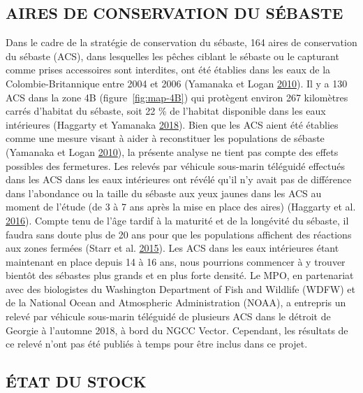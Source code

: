 \documentclass[french,11pt]{book}
\begin{document}
\hypertarget{sec:discussion-rca}{%
\subsection{AIRES DE CONSERVATION DU SÉBASTE}\label{sec:discussion-rca}}

Dans le cadre de la stratégie de conservation du sébaste, 164 aires de conservation du sébaste (ACS), dans lesquelles les pêches ciblant le sébaste ou le capturant comme prises accessoires sont interdites, ont été établies dans les eaux de la Colombie-Britannique entre 2004 et 2006 (Yamanaka et Logan \protect\hyperlink{ref-yamanaka2010}{2010}). Il y a 130 ACS dans la zone 4B (figure~\ref{fig:map-4B}) qui protègent environ 267 kilomètres carrés d'habitat du sébaste, soit 22 \% de l'habitat disponible dans les eaux intérieures (Haggarty et Yamanaka \protect\hyperlink{ref-haggarty2018}{2018}). Bien que les ACS aient été établies comme une mesure visant à aider à reconstituer les populations de sébaste (Yamanaka et Logan \protect\hyperlink{ref-yamanaka2010}{2010}), la présente analyse ne tient pas compte des effets possibles des fermetures. Les relevés par véhicule sous-marin téléguidé effectués dans les ACS dans les eaux intérieures ont révélé qu'il n'y avait pas de différence dans l'abondance ou la taille du sébaste aux yeux jaunes dans les ACS au moment de l'étude (de 3 à 7 ans après la mise en place des aires) (Haggarty et al. \protect\hyperlink{ref-haggarty2016b}{2016}). Compte tenu de l'âge tardif à la maturité et de la longévité du sébaste, il faudra sans doute plus de 20 ans pour que les populations affichent des réactions aux zones fermées (Starr et al. \protect\hyperlink{ref-starr2015}{2015}). Les ACS dans les eaux intérieures étant maintenant en place depuis 14 à 16 ans, nous pourrions commencer à y trouver bientôt des sébastes plus grands et en plus forte densité. Le MPO, en partenariat avec des biologistes du Washington Department of Fish and Wildlife (WDFW) et de la National Ocean and Atmospheric Administration (NOAA), a entrepris un relevé par véhicule sous-marin téléguidé de plusieurs ACS dans le détroit de Georgie à l'automne 2018, à bord du NGCC Vector. Cependant, les résultats de ce relevé n'ont pas été publiés à temps pour être inclus dans ce projet.

\hypertarget{sec:discussion-status}{%
\subsection{ÉTAT DU STOCK}\label{sec:discussion-status}}
\end{document}
